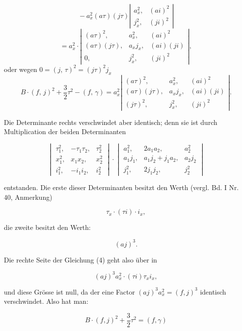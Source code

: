 \documentclass[11pt]{article}
\providecommand{\weberpage}[1]{}
\providecommand{\weq}[2]{\begin{equation}\tag{#1}#2\end{equation}}
\begin{document}
\[
{}- a_x^2(a\tau)(j\tau)\left|\begin{array}{cc} a_x^2, & (ai)^2 \\ j_x^2, & (ji)^2 \end{array}\right|
\]
\[
= a_x^2\cdot\left|\begin{array}{ccc} (a\tau)^2, & a_x^2, & (ai)^2 \\ (a\tau)(j\tau), & a_xj_x, & (ai)(ji) \\ 0, & j_x^2, & (ji)^2 \end{array}\right|,
\]
oder wegen $0=(j,\,\tau)^2=(j\tau)^2j_x$
\weq{4}{B\cdot(f,\,j)^2 + \frac{3}{2}\tau^2 - (f,\,\gamma) = a_x^2\left|\begin{array}{ccc} (a\tau)^2, & a_x^2, & (ai)^2 \\ (a\tau)(j\tau), & a_xj_x, & (ai)(ji) \\ (j\tau)^2, & j_x^2, & (ji)^2 \end{array}\right|.}


\weberpage{265}
Die Determinante rechts verschwindet aber identisch; denn sie
ist durch Multiplication der beiden Determinanten

\[
\begin{vmatrix} \tau_1^{2}, & -\tau_1\tau_2, & \tau_2^{2} \\ x_1^{2}, & x_1x_2, & x_2^{2} \\ i_1^{2}, & -i_1i_2, & i_2^{2} \end{vmatrix}
\cdot
\begin{vmatrix} a_1^{2}, & 2a_1a_2, & a_2^{2} \\ a_1j_1, & a_1j_2+j_1a_2, & a_2j_2 \\ j_1^{2}, & 2j_1j_2, & j_2^{2} \end{vmatrix}
\]

entstanden. Die erste dieser Determinanten besitzt den Werth (vergl.
Bd. I Nr. 40, Anmerkung)

\[ \tau_x\cdot(\tau i)\cdot i_x, \]

die zweite besitzt den Werth:

\[ (aj)^3. \]

Die rechte Seite der Gleichung (4) geht also über in

\[ (aj)^3a_x^2\cdot(\tau i)\tau_x i_x, \]

und diese Grösse ist null, da der eine Factor $(aj)^3a_x^2=(f,j)^3$ identisch
verschwindet. Also hat man:

\[ B\cdot(f,j)^2+\frac{3}{2}\tau^2=(f,\gamma) \]
\end{document}
